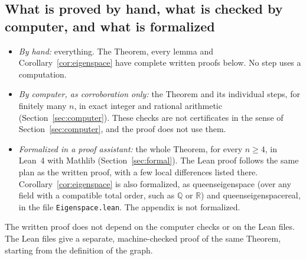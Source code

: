\documentclass[11pt]{amsart}
\theoremstyle{plain}
\theoremstyle{definition}
\theoremstyle{remark}
\numberwithin{equation}{section}
\newcommand{\R}{\mathbb{R}}
\newcommand{\leanus}{\textunderscore\allowbreak}
\newcommand{\lean}[1]{{\ttfamily\let\_\leanus #1}}  %
\begin{document}
\subsection{What is proved by hand, what is checked by computer, and what is
formalized}
\begin{itemize}
\item \emph{By hand:} everything. The Theorem, every lemma and Corollary~\ref{cor:eigenspace}
have complete written proofs below. No step uses a computation.
\item \emph{By computer, as corroboration only:} the Theorem and its individual steps,
for finitely many \(n\), in exact integer and rational arithmetic
(Section~\ref{sec:computer}). These checks are not certificates in the sense of
Section~\ref{sec:computer}, and the proof does not use them.
\item \emph{Formalized in a proof assistant:} the whole Theorem, for every \(n\ge4\),
in Lean~4 with Mathlib (Section~\ref{sec:formal}). The Lean proof follows the
same plan as the written proof, with a few local differences listed there.
Corollary~\ref{cor:eigenspace} is also formalized, as \lean{queens\_eigenspace} (over
any field with a compatible total order, such as \(\mathbb{Q}\) or \(\R\)) and \lean{queens\_eigenspace\_real}, in the file
\nolinkurl{Eigenspace.lean}. The appendix is not formalized.
\end{itemize}
The written proof does not depend on the computer checks or on the Lean files. The Lean
files give a separate, machine-checked proof of the same Theorem, starting from the
definition of the graph.
\end{document}
